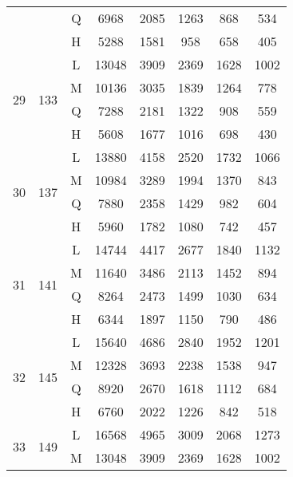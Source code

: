 \begin{table}[H]
\begin{tabular}{|c|c|c|c|c|c|c|c|}
                    &                      & Q & 6968  & 2085 & 1263 & 868  & 534  \\ \cline{3-8}
                    &                      & H & 5288  & 1581 & 958  & 658  & 405  \\ \hline
\multirow{4}{*}{29} & \multirow{4}{*}{133} & L & 13048 & 3909 & 2369 & 1628 & 1002 \\ \cline{3-8}
                    &                      & M & 10136 & 3035 & 1839 & 1264 & 778  \\ \cline{3-8}
                    &                      & Q & 7288  & 2181 & 1322 & 908  & 559  \\ \cline{3-8}
                    &                      & H & 5608  & 1677 & 1016 & 698  & 430  \\ \hline
\multirow{4}{*}{30} & \multirow{4}{*}{137} & L & 13880 & 4158 & 2520 & 1732 & 1066 \\ \cline{3-8}
                    &                      & M & 10984 & 3289 & 1994 & 1370 & 843  \\ \cline{3-8}
                    &                      & Q & 7880  & 2358 & 1429 & 982  & 604  \\ \cline{3-8}
                    &                      & H & 5960  & 1782 & 1080 & 742  & 457  \\ \hline
\multirow{4}{*}{31} & \multirow{4}{*}{141} & L & 14744 & 4417 & 2677 & 1840 & 1132 \\ \cline{3-8}
                    &                      & M & 11640 & 3486 & 2113 & 1452 & 894  \\ \cline{3-8}
                    &                      & Q & 8264  & 2473 & 1499 & 1030 & 634  \\ \cline{3-8}
                    &                      & H & 6344  & 1897 & 1150 & 790  & 486  \\ \hline
\multirow{4}{*}{32} & \multirow{4}{*}{145} & L & 15640 & 4686 & 2840 & 1952 & 1201 \\ \cline{3-8}
                    &                      & M & 12328 & 3693 & 2238 & 1538 & 947  \\ \cline{3-8}
                    &                      & Q & 8920  & 2670 & 1618 & 1112 & 684  \\ \cline{3-8}
                    &                      & H & 6760  & 2022 & 1226 & 842  & 518  \\ \hline
\multirow{4}{*}{33} & \multirow{4}{*}{149} & L & 16568 & 4965 & 3009 & 2068 & 1273 \\ \cline{3-8}
                    &                      & M & 13048 & 3909 & 2369 & 1628 & 1002 \\ \cline{3-8}

\end{tabular}
\end{table}

